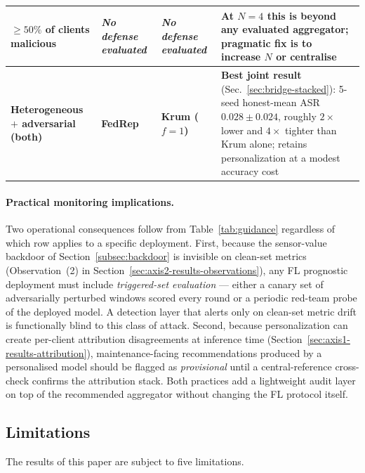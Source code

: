\documentclass[a4paper,fleqn,doubleblind]{cas-sc}
\begin{document}
\begin{table}[pos=tbp]
\begin{tabular}{@{}>{\raggedright\arraybackslash}p{4.1cm} >{\raggedright\arraybackslash}p{2.7cm} >{\raggedright\arraybackslash}p{2.7cm} >{\raggedright\arraybackslash}p{4.3cm}@{}}
$\geq 50\%$ of clients malicious              & \emph{No defense evaluated} & \emph{No defense evaluated}        & At $N = 4$ this is beyond any evaluated aggregator; pragmatic fix is to increase $N$ or centralise \\
\midrule
\textbf{Heterogeneous $+$ adversarial (both)} & \textbf{FedRep}            & \textbf{Krum ($f = 1$)}            & \textbf{Best joint result} (Sec.~\ref{sec:bridge-stacked}): 5-seed honest-mean ASR $0.028 \pm 0.024$, roughly $2\times$ lower and $4\times$ tighter than Krum alone; retains personalization at a modest accuracy cost \\
\bottomrule
\end{tabular}
\end{table}

\paragraph{Practical monitoring implications.}
Two operational consequences follow from Table~\ref{tab:guidance}
regardless of which row applies to a specific deployment. First,
because the sensor-value backdoor of Section~\ref{subsec:backdoor}
is invisible on clean-set metrics (Observation~(2) in
Section~\ref{sec:axis2-results-observations}), any FL prognostic
deployment must include \emph{triggered-set evaluation} --- either
a canary set of adversarially perturbed windows scored every round
or a periodic red-team probe of the deployed model. A detection
layer that alerts only on clean-set metric drift is functionally
blind to this class of attack. Second, because personalization can
create per-client attribution disagreements at inference time
(Section~\ref{sec:axis1-results-attribution}), maintenance-facing
recommendations produced by a personalised model should be flagged
as \emph{provisional} until a central-reference cross-check
confirms the attribution stack. Both practices add a lightweight
audit layer on top of the recommended aggregator without changing
the FL protocol itself.

\subsection{Limitations}
\label{sec:discuss-limitations}

The results of this paper are subject to five limitations.
\end{document}
